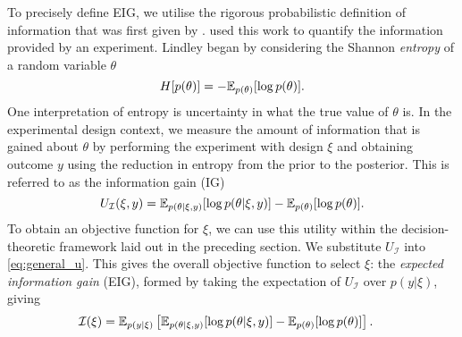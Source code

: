 \documentclass[a4paper, 10pt]{report}
\theoremstyle{plain}
\newtheorem{example}[theorem]{Example}
\begin{document}
	To precisely define EIG, we utilise the rigorous probabilistic definition of information that was first given by \citet{shannon1948mathematical}.
	\citet{lindley1956} used this work to quantify the information provided by an experiment.
	Lindley began by considering the Shannon \emph{entropy} of a random variable $\theta$
	\begin{equation}
	\label{eq:entropy}
	H[p(\theta)] = -\mathbb{E}_{p(\theta)}[\log p(\theta)].
	\end{equation}
	One interpretation of entropy is uncertainty in what the true value of $\theta$ is.
	In the experimental design context, we measure the amount of information that is gained about $\theta$ by performing the experiment with design $\xi$ and obtaining outcome $y$ using the reduction in entropy from the prior to the posterior. This is referred to as the information gain (IG)
	\begin{equation}
	U_\mathcal{I}(\xi,y) = \mathbb{E}_{p(\theta|\xi,y)}[\log p(\theta|\xi,y)]-\mathbb{E}_{p(\theta)}[\log p(\theta)].
	\end{equation}
	To obtain an objective function for $\xi$, we can use this utility within the decision-theoretic framework laid out in the preceding section.
	We substitute $U_\mathcal{I}$ into \eqref{eq:general_u}.
	This gives the overall objective function to select $\xi$: the \emph{expected information gain} (EIG), formed by taking the expectation of $U_\mathcal{I}$ over $p(y|\xi)$, giving
	\begin{align}
	\mathcal{I}(\xi) &= \mathbb{E}_{p(y|\xi)}\left[ \mathbb{E}_{p(\theta|\xi,y)}[\log p(\theta|\xi,y)]-\mathbb{E}_{p(\theta)}[\log p(\theta)] \right].
	\label{eq:eigmi}
	\end{align}
	
\end{document}
